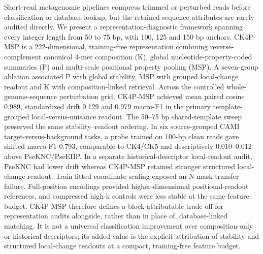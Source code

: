 Short-read metagenomic pipelines compress trimmed or perturbed reads before classification or database lookup, but the retained sequence attributes are rarely audited directly. We present a representation-diagnostic framework spanning every integer length from 50 to 75 bp, with 100, 125 and 150 bp anchors. CK4P-MSP is a 222-dimensional, training-free representation combining reverse-complement canonical 4-mer composition (K), global nucleotide-property-coded summaries (P) and multi-scale positional property pooling (MSP). A seven-group ablation associated P with global stability, MSP with grouped local-change readout and K with composition-linked retrieval. Across the controlled whole-genome-sequence perturbation grid, CK4P-MSP achieved mean paired cosine 0.989, standardized drift 0.129 and 0.979 macro-F1 in the primary template-grouped local-versus-nuisance readout. The 50--75 bp shared-template sweep preserved the same stability--readout ordering. In six source-grouped CAMI target-versus-background tasks, a probe trained on 100-bp clean reads gave shifted macro-F1 0.793, comparable to CK4/CK5 and descriptively 0.010--0.012 above PseKNC/PseEIIP. In a separate historical-descriptor local-readout audit, PseKNC had lower drift whereas CK4P-MSP retained stronger structured local-change readout. Train-fitted coordinate scaling exposed an N-mask transfer failure. Full-position encodings provided higher-dimensional positional-readout references, and compressed high-k controls were less stable at the same feature budget. CK4P-MSP therefore defines a block-attributable trade-off for representation audits alongside, rather than in place of, database-linked matching. It is not a universal classification improvement over composition-only or historical descriptors; its added value is the explicit attribution of stability and structured local-change readouts at a compact, training-free feature budget.
